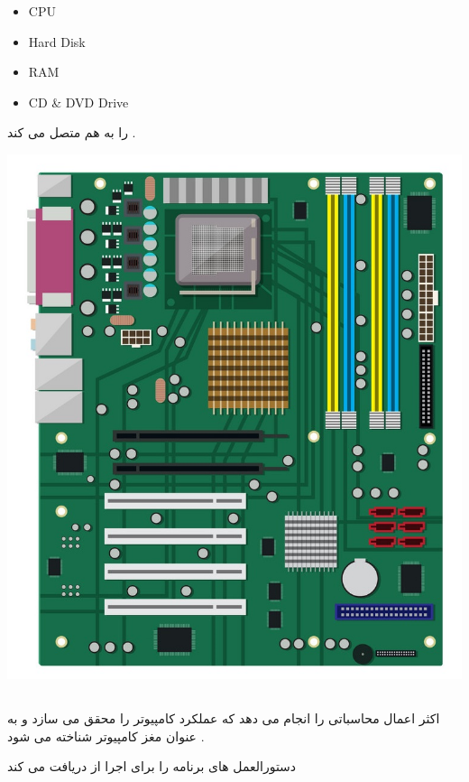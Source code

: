 \documentclass[12pt]{book}
\begin{document}
\begin{latin}
\begin{itemize}
	\item CPU
	\item Hard Disk
	\item RAM
	\item CD \& DVD Drive
\end{itemize}
\end{latin}

را به هم متصل می کند .

\begin{center}
	\includegraphics[scale=0.3]{./motherboard-isolated-on-white-vector-13730635.jpg}
\end{center}

\subsection{}

اکثر اعمال محاسباتی را انجام می دهد که عملکرد کامپیوتر را محقق می سازد و به عنوان مغز کامپیوتر شناخته می شود .

دستورالعمل های برنامه را برای اجرا از 
دریافت می کند 
\end{document}

